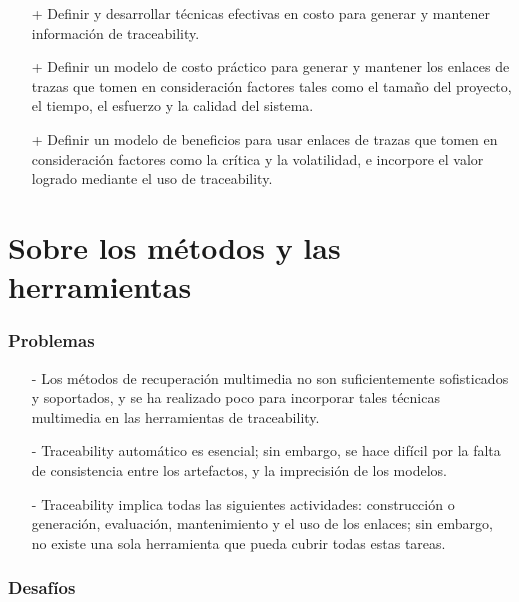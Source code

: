 \documentclass[a4paper,12pt,oneside]{book}
\begin{document}
\begin{itemize}

\item[+]     Definir y desarrollar técnicas efectivas en costo para generar y mantener información de traceability.

\item[+]    Definir un modelo de costo práctico para generar y mantener los enlaces de trazas que tomen en consideración factores tales como el tamaño del proyecto, el tiempo, el esfuerzo y la calidad del sistema.

\item[+]   Definir un modelo de beneficios para usar enlaces de trazas que tomen en consideración factores como la crítica y la volatilidad, e incorpore el valor logrado mediante el uso de traceability.

\end{itemize}

\section{Sobre los métodos y las herramientas}

\subsubsection{Problemas}

\begin{itemize}

\item[-]     Los métodos de recuperación multimedia no son suficientemente sofisticados y soportados, y se ha realizado poco para incorporar tales técnicas multimedia en las herramientas de traceability.

\item[-]   Traceability automático es esencial; sin embargo, se hace difícil por la falta de consistencia entre los artefactos, y la imprecisión de los modelos.

\item[-]    Traceability implica todas las siguientes actividades: construcción o generación, evaluación, mantenimiento y el uso de los enlaces; sin embargo, no existe una sola herramienta que pueda cubrir todas estas tareas.

\end{itemize}

\subsubsection{Desafíos}
\end{document}
